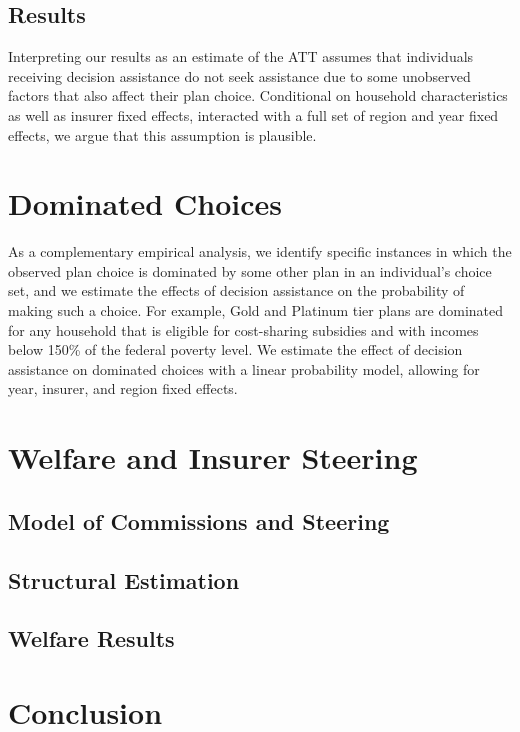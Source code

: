 \documentclass[12pt]{article}
\begin{document}
\subsection{Results}
\label{subsec:causal-results}

Interpreting our results as an estimate of the ATT assumes that individuals receiving decision assistance do not seek assistance due to some unobserved factors that also affect their plan choice. Conditional on household characteristics as well as insurer fixed effects, interacted with a full set of region and year fixed effects, we argue that this assumption is plausible. 


\section{Dominated Choices}
\label{sec:dominated}
As a complementary empirical analysis, we identify specific instances in which the observed plan choice is dominated by some other plan in an individual's choice set, and we estimate the effects of decision assistance on the probability of making such a choice. For example, Gold and Platinum tier plans are dominated for any household that is eligible for cost-sharing subsidies and with incomes below 150\% of the federal poverty level. We estimate the effect of decision assistance on dominated choices with a linear probability model, allowing for year, insurer, and region fixed effects.


\section{Welfare and Insurer Steering}
\label{sec:steering}


\subsection{Model of Commissions and Steering}
\label{subsec:steering-model}


\subsection{Structural Estimation}
\label{subsec:steering-methods}

\subsection{Welfare Results}
\label{subsec:steering-results}


\section{Conclusion}
\label{sec:conclusion}
\end{document}
